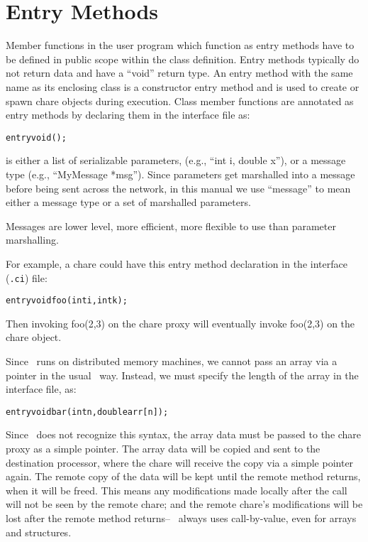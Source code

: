 \section{Entry Methods}
\label{entry}

Member functions in the user program which function as entry methods have to be
defined in public scope within the class definition.
Entry methods typically do not return data and have a ``void'' return type.
An entry method with the same name as its enclosing class is a constructor entry method
and is used to create or spawn chare objects during execution.
Class member functions are annotated as entry methods by declaring them in
the interface file as:
\begin{alltt}
entry void ();
\end{alltt}

 is either a list of serializable parameters, (e.g., ``int i,
double x''), or a message type (e.g., ``MyMessage *msg'').
Since parameters get marshalled into a message before being sent across the
network, in this manual we use ``message'' to mean either a message type or a
set of marshalled parameters.


Messages are lower level, more efficient, more flexible to use than parameter marshalling.

For example, a chare could have this entry method declaration in 
the interface ({\tt .ci}) file:
\begin{alltt}
  entry void foo(int i,int k);
\end{alltt}
Then invoking foo(2,3) on the chare proxy will eventually
invoke foo(2,3) on the chare object.

Since \charmpp\ runs on distributed memory machines, we cannot
pass an array via a pointer in the usual \CC\ way.  Instead,
we must specify the length of the array in the interface file, as:
\begin{alltt}
  entry void bar(int n,double arr[n]);
\end{alltt}
Since \CC\ does not recognize this syntax, the array data
must be passed to the chare proxy as a simple pointer.
The array data will be copied and sent to the
destination processor, where the chare will receive the copy
via a simple pointer again.  The remote copy of the data
will be kept until the remote method returns, when
it will be freed.  
This means any modifications made locally after the call will not be 
seen by the remote chare; and the remote chare's modifications
will be lost after the remote method returns-- \charmpp\ always 
uses call-by-value, even for arrays and structures.  

